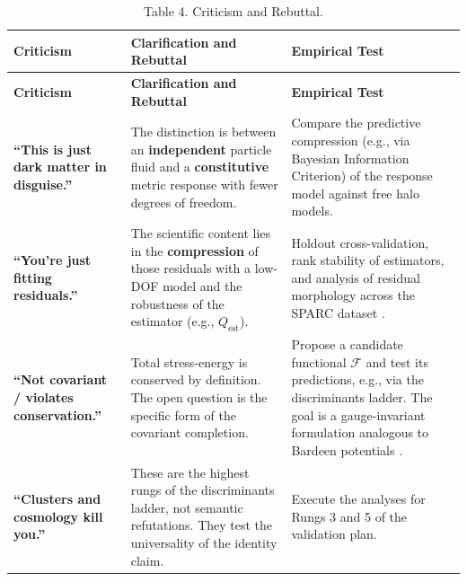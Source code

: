 \documentclass[11pt]{article}
\begin{document}
\begin{longtable}[]{@{}
  >{\raggedright\arraybackslash}p{}
  >{\raggedright\arraybackslash}p{}
  >{\raggedright\arraybackslash}p{}@{}}
\caption{\protect{}\label{_Toc222952634}{}Table 4. Criticism and Rebuttal.}\tabularnewline
\toprule\noalign{}
\begin{minipage}[b]{\linewidth}\centering
\textbf{Criticism}
\end{minipage} & \begin{minipage}[b]{\linewidth}\centering
\textbf{Clarification and Rebuttal}
\end{minipage} & \begin{minipage}[b]{\linewidth}\centering
\textbf{Empirical Test}
\end{minipage} \\
\midrule\noalign{}
\endfirsthead
\toprule\noalign{}
\begin{minipage}[b]{\linewidth}\centering
\textbf{Criticism}
\end{minipage} & \begin{minipage}[b]{\linewidth}\centering
\textbf{Clarification and Rebuttal}
\end{minipage} & \begin{minipage}[b]{\linewidth}\centering
\textbf{Empirical Test}
\end{minipage} \\
\midrule\noalign{}
\endhead
\bottomrule\noalign{}
\endlastfoot
\textbf{``This is just dark matter in disguise.''} & The distinction is between an \textbf{independent} particle fluid and a \textbf{constitutive} metric response with fewer degrees of freedom. & Compare the predictive compression (e.g., via Bayesian Information Criterion) of the response model against free halo models. \\
\textbf{``You're just fitting residuals.''} & The scientific content lies in the \textbf{compression} of those residuals with a low-DOF model and the robustness of the estimator (e.g., \(Q_{\text{est}}\)). & Holdout cross-validation, rank stability of estimators, and analysis of residual morphology across the SPARC dataset \citep{Lelli2016SPARC}. \\
\textbf{``Not covariant / violates conservation.''} & Total stress-energy is conserved by definition. The open question is the specific form of the covariant completion. & Propose a candidate functional \(\mathcal{F}\) and test its predictions, e.g., via the discriminants ladder. The goal is a gauge-invariant formulation analogous to Bardeen potentials \citep{Bardeen1980}. \\
\textbf{``Clusters and cosmology kill you.''} & These are the highest rungs of the discriminants ladder, not semantic refutations. They test the universality of the identity claim. & Execute the analyses for Rungs 3 and 5 of the validation plan. \\
\end{longtable}
\end{document}
